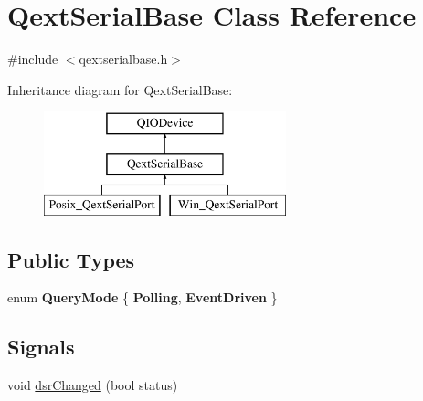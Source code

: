 \hypertarget{class_qext_serial_base}{}\section{Qext\+Serial\+Base Class Reference}
\label{class_qext_serial_base}


{\ttfamily \#include $<$qextserialbase.\+h$>$}

Inheritance diagram for Qext\+Serial\+Base\+:\begin{figure}[H]
\begin{center}
\leavevmode
\includegraphics[height=3.000000cm]{class_qext_serial_base}
\end{center}
\end{figure}
\subsection*{Public Types}
\begin{DoxyCompactItemize}
\item 
\mbox{\label{class_qext_serial_base_abab21776f71ceb4989ad2326680143f5}} 
enum {\bfseries Query\+Mode} \{ {\bfseries Polling}, 
{\bfseries Event\+Driven}
 \}
\end{DoxyCompactItemize}
\subsection*{Signals}
\begin{DoxyCompactItemize}
\item 
void \mbox{\hyperlink{class_qext_serial_base_abc9dc7c9a7735476800eb5aa35bec6a8}{dsr\+Changed}} (bool status)
\end{DoxyCompactItemize}
